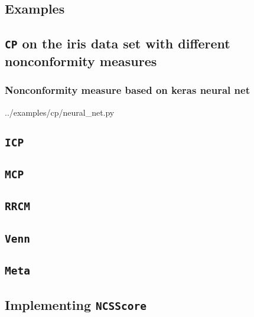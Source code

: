 \documentclass[twoside,11pt]{article}
\begin{document}
\begin{appendices}

  \lstset{%
    numbers = left,
    firstnumber = 0,
    stepnumber = 5,
    frame = single,
    breaklines = true,
  }

  \section{Examples}
  \label{appendix:b}

  \subsection{\texttt{CP} on the iris data set with
              different nonconformity measures}

  

  \subsubsection{Nonconformity measure based on keras
                 neural net}

  
  {../examples/cp/neural_net.py}

  \subsection{\texttt{ICP}}

  \subsection{\texttt{MCP}}

  \subsection{\texttt{RRCM}}

  \subsection{\texttt{Venn}}

  \subsection{\texttt{Meta}}

  \subsection{Implementing \texttt{NCSScore}}

\end{appendices}


\end{document}
